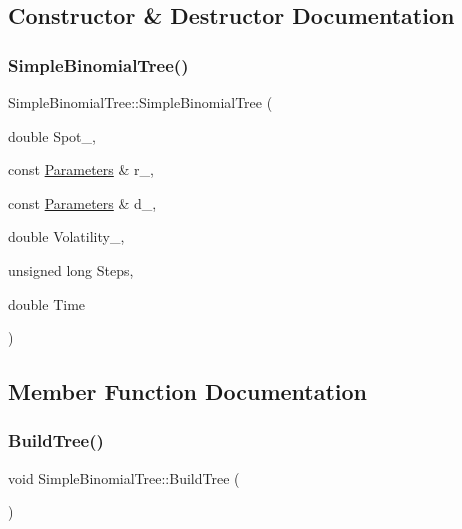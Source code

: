 \subsection{Constructor \& Destructor Documentation}
\hypertarget{classSimpleBinomialTree_af375f6a3371a0a69ac55d93b3b6ca610}{}\label{classSimpleBinomialTree_af375f6a3371a0a69ac55d93b3b6ca610} 
\subsubsection{\texorpdfstring{Simple\+Binomial\+Tree()}{SimpleBinomialTree()}}
{\footnotesize\ttfamily Simple\+Binomial\+Tree\+::\+Simple\+Binomial\+Tree (\begin{DoxyParamCaption}\item[{double}]{Spot\+\_\+,  }\item[{const \hyperlink{classParameters}{Parameters} \&}]{r\+\_\+,  }\item[{const \hyperlink{classParameters}{Parameters} \&}]{d\+\_\+,  }\item[{double}]{Volatility\+\_\+,  }\item[{unsigned long}]{Steps,  }\item[{double}]{Time }\end{DoxyParamCaption})}



\subsection{Member Function Documentation}
\hypertarget{classSimpleBinomialTree_a6ca5a5c663d538af02a8316cd227e071}{}\label{classSimpleBinomialTree_a6ca5a5c663d538af02a8316cd227e071} 
\subsubsection{\texorpdfstring{Build\+Tree()}{BuildTree()}}
{\footnotesize\ttfamily void Simple\+Binomial\+Tree\+::\+Build\+Tree (\begin{DoxyParamCaption}{ }\end{DoxyParamCaption})\hspace{0.3cm}{\ttfamily [protected]}}


